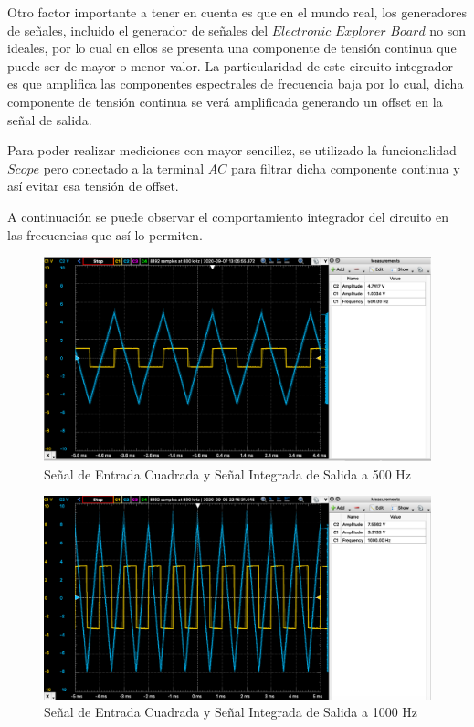 Otro factor importante a tener en cuenta es que en el mundo real, los generadores de señales, incluido el generador de señales del $Electronic$ $Explorer$ $Board$ no son ideales,
por lo cual en ellos se presenta una componente de tensión continua que puede ser de mayor o menor valor. La particularidad de este circuito integrador es que amplifica las componentes 
espectrales de frecuencia baja por lo cual, dicha componente de tensión continua se verá amplificada generando un offset en la señal de salida.

Para poder realizar mediciones con mayor sencillez, se utilizado la funcionalidad $Scope$ pero conectado a la terminal $AC$ para filtrar dicha componente continua y así evitar
esa tensión de offset. 


A continuación se puede observar el comportamiento integrador del circuito en las frecuencias que así lo permiten.

\begin{figure}[H]
    \centering 
    \includegraphics [scale=0.45] {../Ejercicio3-CircuitoIntegradoresyDerivadores/Imagenes/cuadrada-500.png} 
    \caption{Señal de Entrada Cuadrada y Señal Integrada de Salida a 500 Hz }
    \label{fig:emptyPlotTool}
\end{figure}

\begin{figure}[H]
    \centering 
    \includegraphics [scale=0.45] {../Ejercicio3-CircuitoIntegradoresyDerivadores/Imagenes/cuadrada-1000.png} 
    \caption{Señal de Entrada Cuadrada y Señal Integrada de Salida a 1000 Hz }
    \label{fig:emptyPlotTool}
\end{figure}

